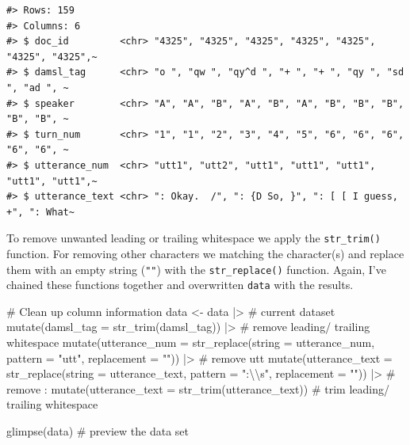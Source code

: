\documentclass[
  letterpaper,
]{latex/krantz}
\newenvironment{Shaded}{\begin{snugshade}}{\end{snugshade}}
\newcommand{\AttributeTok}[1]{\textcolor[rgb]{0.40,0.45,0.13}{#1}}
\newcommand{\CommentTok}[1]{\textcolor[rgb]{0.37,0.37,0.37}{#1}}
\newcommand{\FunctionTok}[1]{\textcolor[rgb]{0.28,0.35,0.67}{#1}}
\newcommand{\NormalTok}[1]{\textcolor[rgb]{0.00,0.23,0.31}{#1}}
\newcommand{\OtherTok}[1]{\textcolor[rgb]{0.00,0.23,0.31}{#1}}
\newcommand{\SpecialCharTok}[1]{\textcolor[rgb]{0.37,0.37,0.37}{#1}}
\newcommand{\StringTok}[1]{\textcolor[rgb]{0.13,0.47,0.30}{#1}}
\begin{document}
\begin{verbatim}
#> Rows: 159
#> Columns: 6
#> $ doc_id         <chr> "4325", "4325", "4325", "4325", "4325", "4325", "4325",~
#> $ damsl_tag      <chr> "o ", "qw ", "qy^d ", "+ ", "+ ", "qy ", "sd ", "ad ", ~
#> $ speaker        <chr> "A", "A", "B", "A", "B", "A", "B", "B", "B", "B", "B", ~
#> $ turn_num       <chr> "1", "1", "2", "3", "4", "5", "6", "6", "6", "6", "6", ~
#> $ utterance_num  <chr> "utt1", "utt2", "utt1", "utt1", "utt1", "utt1", "utt1",~
#> $ utterance_text <chr> ": Okay.  /", ": {D So, }", ": [ [ I guess, +", ": What~
\end{verbatim}

To remove unwanted leading or trailing whitespace we apply the
\texttt{str\_trim()} function. For removing other characters we matching
the character(s) and replace them with an empty string (\texttt{""})
with the \texttt{str\_replace()} function. Again, I've chained these
functions together and overwritten \texttt{data} with the results.

\begin{Shaded}
\begin{Highlighting}[]
\CommentTok{\# Clean up column information}
\NormalTok{data }\OtherTok{\textless{}{-}} 
\NormalTok{  data }\SpecialCharTok{|\textgreater{}} \CommentTok{\# current dataset}
  \FunctionTok{mutate}\NormalTok{(}\AttributeTok{damsl\_tag =} \FunctionTok{str\_trim}\NormalTok{(damsl\_tag)) }\SpecialCharTok{|\textgreater{}} \CommentTok{\# remove leading/ trailing whitespace}
  \FunctionTok{mutate}\NormalTok{(}\AttributeTok{utterance\_num =} \FunctionTok{str\_replace}\NormalTok{(}\AttributeTok{string =}\NormalTok{ utterance\_num, }\AttributeTok{pattern =} \StringTok{"utt"}\NormalTok{, }\AttributeTok{replacement =} \StringTok{""}\NormalTok{)) }\SpecialCharTok{|\textgreater{}} \CommentTok{\# remove \textquotesingle{}utt\textquotesingle{}}
  \FunctionTok{mutate}\NormalTok{(}\AttributeTok{utterance\_text =} \FunctionTok{str\_replace}\NormalTok{(}\AttributeTok{string =}\NormalTok{ utterance\_text, }\AttributeTok{pattern =} \StringTok{":}\SpecialCharTok{\textbackslash{}\textbackslash{}}\StringTok{s"}\NormalTok{, }\AttributeTok{replacement =} \StringTok{""}\NormalTok{)) }\SpecialCharTok{|\textgreater{}} \CommentTok{\# remove \textquotesingle{}: \textquotesingle{}}
  \FunctionTok{mutate}\NormalTok{(}\AttributeTok{utterance\_text =} \FunctionTok{str\_trim}\NormalTok{(utterance\_text)) }\CommentTok{\# trim leading/ trailing whitespace}

\FunctionTok{glimpse}\NormalTok{(data) }\CommentTok{\# preview the data set}
\end{Highlighting}
\end{Shaded}
\end{document}
